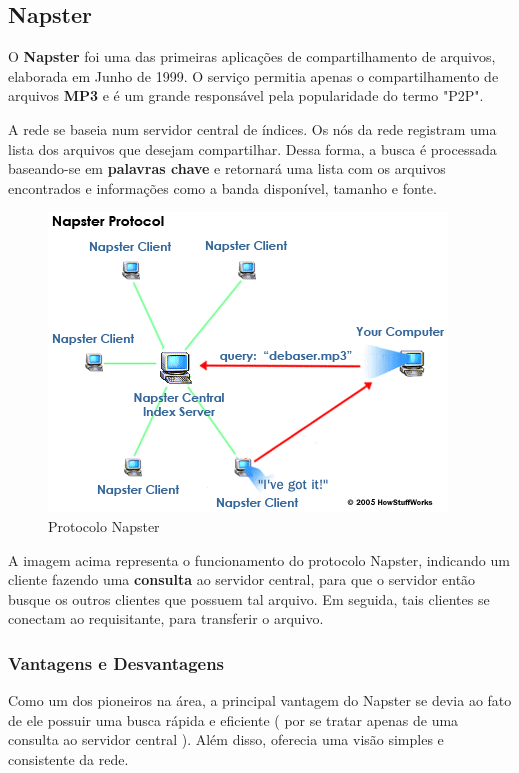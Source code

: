\documentclass[a4paper]{article}
\begin{document}
\subsection{Napster}
O \textbf{Napster} foi uma das primeiras aplicações de compartilhamento de arquivos, elaborada em Junho de 1999. O serviço permitia apenas o compartilhamento de arquivos \textbf{MP3} e é um grande responsável pela popularidade do termo "P2P".

A rede se baseia num servidor central de índices. Os nós da rede registram uma lista dos arquivos que desejam compartilhar. Dessa forma, a busca é processada baseando-se em \textbf{palavras chave} e retornará uma lista com os arquivos encontrados e informações como a banda disponível, tamanho e fonte. 

\begin{figure}[ht]
\begin{center}
  \includegraphics[scale=0.5]{img//ilustracaoiot.png} 
  \caption{Protocolo Napster \cite{howstuffworks} \label{figure1}}
\end{center}
\end{figure}

A imagem acima representa o funcionamento do protocolo Napster, indicando um cliente fazendo uma \textbf{consulta} ao servidor central, para que o servidor então busque os outros clientes que possuem tal arquivo. Em seguida, tais clientes se conectam ao requisitante, para transferir o arquivo.

\subsubsection{Vantagens e Desvantagens}
Como um dos pioneiros na área, a principal vantagem do Napster se devia ao fato de ele possuir uma busca rápida e eficiente ( por se tratar apenas de uma consulta ao servidor central ). Além disso, oferecia uma visão simples e consistente da rede. 
\end{document}
